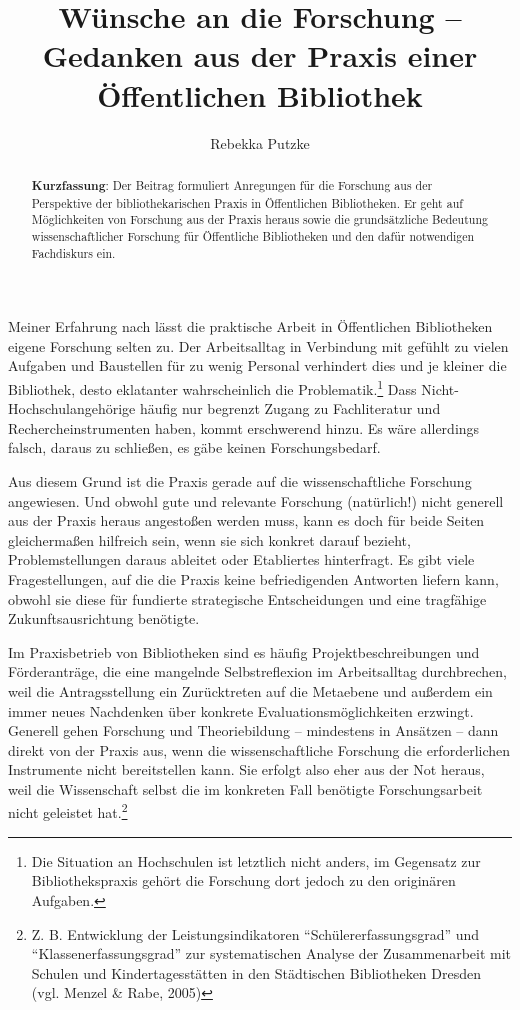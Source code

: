 \documentclass[a4paper,
fontsize=11pt,
oneside,
numbers=noperiodatend,
parskip=half-,
bibliography=totoc,
final
]{scrartcl}
\title{\LARGE{Wünsche an die Forschung -- Gedanken aus der Praxis einer Öffentlichen Bibliothek}} %
\author{Rebekka Putzke} %
\date{}
\begin{document}
\maketitle
\thispagestyle{fancyplain} 

\begin{abstract}
\noindent
\textbf{Kurzfassung}: Der Beitrag formuliert Anregungen für die
Forschung aus der Perspektive der bibliothekarischen Praxis in
Öffentlichen Bibliotheken. Er geht auf Möglichkeiten von Forschung aus
der Praxis heraus sowie die grundsätzliche Bedeutung wissenschaftlicher
Forschung für Öffentliche Bibliotheken und den dafür notwendigen
Fachdiskurs ein.
\end{abstract}

Meiner Erfahrung nach lässt die praktische Arbeit in Öffentlichen
Bibliotheken eigene Forschung selten zu. Der Arbeitsalltag in Verbindung
mit gefühlt zu vielen Aufgaben und Baustellen für zu wenig Personal
verhindert dies und je kleiner die Bibliothek, desto eklatanter
wahrscheinlich die Problematik.\footnote{Die Situation an Hochschulen
  ist letztlich nicht anders, im Gegensatz zur Bibliothekspraxis gehört
  die Forschung dort jedoch zu den originären Aufgaben.} Dass
Nicht-Hochschulangehörige häufig nur begrenzt Zugang zu Fachliteratur
und Rechercheinstrumenten haben, kommt erschwerend hinzu. Es wäre
allerdings falsch, daraus zu schließen, es gäbe keinen Forschungsbedarf.

Aus diesem Grund ist die Praxis gerade auf die wissenschaftliche
Forschung angewiesen. Und obwohl gute und relevante Forschung
(natürlich!) nicht generell aus der Praxis heraus angestoßen werden
muss, kann es doch für beide Seiten gleichermaßen hilfreich sein, wenn
sie sich konkret darauf bezieht, Problemstellungen daraus ableitet oder
Etabliertes hinterfragt. Es gibt viele Fragestellungen, auf die die
Praxis keine befriedigenden Antworten liefern kann, obwohl sie diese für
fundierte strategische Entscheidungen und eine tragfähige
Zukunftsausrichtung benötigte.

Im Praxisbetrieb von Bibliotheken sind es häufig Projektbeschreibungen
und Förderanträge, die eine mangelnde Selbstreflexion im Arbeitsalltag
durchbrechen, weil die Antragsstellung ein Zurücktreten auf die
Metaebene und außerdem ein immer neues Nachdenken über konkrete
Evaluationsmöglichkeiten erzwingt. Generell gehen Forschung und
Theoriebildung -- mindestens in Ansätzen -- dann direkt von der Praxis
aus, wenn die wissenschaftliche Forschung die erforderlichen Instrumente
nicht bereitstellen kann. Sie erfolgt also eher aus der Not heraus, weil
die Wissenschaft selbst die im konkreten Fall benötigte Forschungsarbeit
nicht geleistet hat.\footnote{Z. B. Entwicklung der Leistungsindikatoren
  \enquote{Schülererfassungsgrad} und \enquote{Klassenerfassungsgrad}
  zur systematischen Analyse der Zusammenarbeit mit Schulen und
  Kindertagesstätten in den Städtischen Bibliotheken Dresden (vgl.
  Menzel \& Rabe, 2005)}
\end{document}
